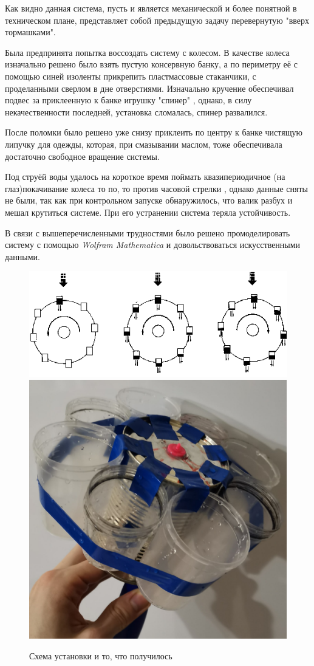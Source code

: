 Как видно данная система, пусть и является механической и более понятной в техническом плане, представляет собой предыдущую задачу перевернутую "вверх тормашками".
	
Была предпринята попытка воссоздать систему с колесом. В качестве колеса изначально решено было взять пустую консервную банку, а по периметру её с помощью синей изоленты прикрепить пластмассовые стаканчики, с проделанными сверлом в дне отверстиями. Изначально кручение обеспечивал подвес за приклеенную к банке игрушку "спинер" , однако, в силу некачественности последней, установка сломалась, спинер развалился. 

После поломки было решено уже снизу приклеить по центру к банке чистящую липучку для одежды, которая, при смазывании маслом, тоже обеспечивала достаточно свободное вращение системы.

Под струёй воды удалось на короткое время поймать квазипериодичное (на глаз)покачивание колеса то по, то против часовой стрелки , однако данные сняты не были, так как при контрольном запуске обнаружилось, что валик разбух и мешал крутиться системе. При его устранении система теряла устойчивость.

В связи с вышеперечисленными трудностями было решено промоделировать систему с помощью \textit{Wolfram Mathematica} и довольствоваться искусственными данными.

\begin{figure}
    \includegraphics[width = 0.70\linewidth]{img/whaterwheel.png}
    \hspace{1cm}
    \includegraphics[width = 0.29\linewidth]{img/equipment.png}
    \caption{Схема установки и то, что получилось}
\end{figure}